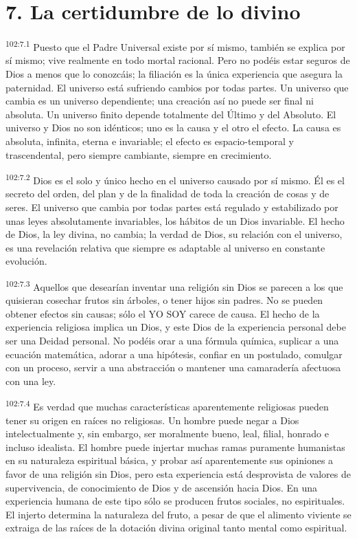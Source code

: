 \section*{7. La certidumbre de lo divino}
\par
\textsuperscript{102:7.1} Puesto que el Padre Universal existe por sí mismo, también se explica por sí mismo; vive realmente en todo mortal racional. Pero no podéis estar seguros de Dios a menos que lo conozcáis; la filiación es la única experiencia que asegura la paternidad. El universo está sufriendo cambios por todas partes. Un universo que cambia es un universo dependiente; una creación así no puede ser final ni absoluta. Un universo finito depende totalmente del Último y del Absoluto. El universo y Dios no son idénticos; uno es la causa y el otro el efecto. La causa es absoluta, infinita, eterna e invariable; el efecto es espacio-temporal y trascendental, pero siempre cambiante, siempre en crecimiento.

\par
\textsuperscript{102:7.2} Dios es el solo y único hecho en el universo causado por sí mismo. Él es el secreto del orden, del plan y de la finalidad de toda la creación de cosas y de seres. El universo que cambia por todas partes está regulado y estabilizado por unas leyes absolutamente invariables, los hábitos de un Dios invariable. El hecho de Dios, la ley divina, no cambia; la verdad de Dios, su relación con el universo, es una revelación relativa que siempre es adaptable al universo en constante evolución.

\par
\textsuperscript{102:7.3} Aquellos que desearían inventar una religión sin Dios se parecen a los que quisieran cosechar frutos sin árboles, o tener hijos sin padres. No se pueden obtener efectos sin causas; sólo el YO SOY carece de causa. El hecho de la experiencia religiosa implica un Dios, y este Dios de la experiencia personal debe ser una Deidad personal. No podéis orar a una fórmula química, suplicar a una ecuación matemática, adorar a una hipótesis, confiar en un postulado, comulgar con un proceso, servir a una abstracción o mantener una camaradería afectuosa con una ley.

\par
\textsuperscript{102:7.4} Es verdad que muchas características aparentemente religiosas pueden tener su origen en raíces no religiosas. Un hombre puede negar a Dios intelectualmente y, sin embargo, ser moralmente bueno, leal, filial, honrado e incluso idealista. El hombre puede injertar muchas ramas puramente humanistas en su naturaleza espiritual básica, y probar así aparentemente sus opiniones a favor de una religión sin Dios, pero esta experiencia está desprovista de valores de supervivencia, de conocimiento de Dios y de ascensión hacia Dios. En una experiencia humana de este tipo sólo se producen frutos sociales, no espirituales. El injerto determina la naturaleza del fruto, a pesar de que el alimento viviente se extraiga de las raíces de la dotación divina original tanto mental como espiritual.

